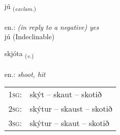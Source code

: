 \documentclass[frontgrid, backgrid]{flacards}\usepackage[]{graphicx}\usepackage[]{xcolor}
\begin{document}

\renewcommand{\flhead}{\vskip5pt \fboxsep=0pt {\small\bfseries\footnotesize Upphrópanir | Exclamation}}
\renewcommand{\fcfoot}{\vskip5pt \fboxsep=0pt \hspace{2pt}{\small\bfseries\footnotesize 1K}}

\renewcommand{\blhead}{\vskip5pt {\small\bfseries\footnotesize Upphrópanir | Exclamation }}
\renewcommand{\bcfoot}{\vskip5pt \hspace{2pt}{\small\bfseries\footnotesize 1K}}


{jú \small{\textsubscript{(\textit{exclam.})}} \\[1ex]
\textphonetic{[juː]} \\
en.: \emph{(in reply to a negative) yes} \\  [2ex]
jú (Indeclinable)}

\renewcommand{\flhead}{\vskip5pt \fboxsep=0pt {\small\bfseries\footnotesize Sagnorð | Verb}}
\renewcommand{\fcfoot}{\vskip5pt \fboxsep=0pt \hspace{2pt}{\small\bfseries\footnotesize 1K}}

\renewcommand{\blhead}{\vskip5pt {\small\bfseries\footnotesize Sagnorð | Verb }}
\renewcommand{\bcfoot}{\vskip5pt \hspace{2pt}{\small\bfseries\footnotesize 1K}}


{skjóta \small{\textsubscript{(\textit{v.})}} \\[1ex] %
\textphonetic{[scouːta]} \\
en.: \emph{shoot, hit} \\  [2ex]
\renewcommand*{\arraystretch}{0.8}
\begin{tabular}{p{1cm}l}
\textsc{1sg}: & skýt -- skaut -- skotið \\ 
\textsc{2sg}: & skýtur -- skaust -- skotið \\ 
\textsc{3sg}: & skýtur -- skaut -- skotið \\ 
\end{tabular}
}
\end{document}
